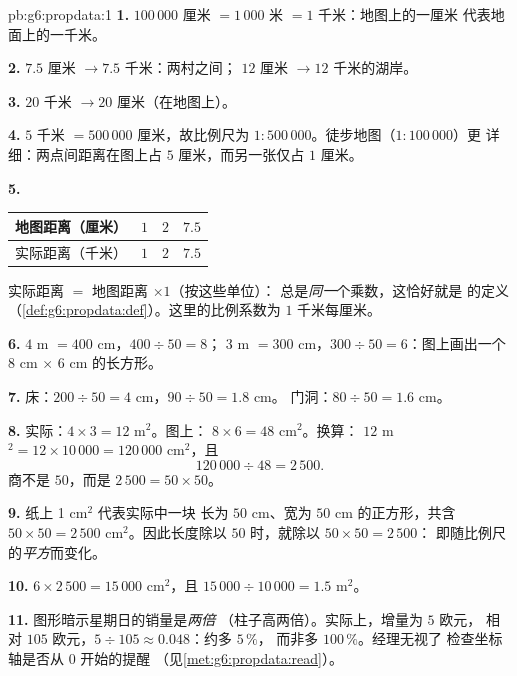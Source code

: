 \begin{solution}{pb:g6:propdata:1}
\textbf{1.} $100\,000$ 厘米 $= 1\,000$ 米 $= 1$ 千米：地图上的一厘米
代表地面上的一千米。

\textbf{2.} $7.5$ 厘米 $\rightarrow 7.5$ 千米：两村之间；
$12$ 厘米 $\rightarrow 12$ 千米的湖岸。

\textbf{3.} $20$ 千米 $\rightarrow 20$ 厘米（在地图上）。

\textbf{4.} $5$ 千米 $= 500\,000$ 厘米，故比例尺为
$1:500\,000$。徒步地图（$1:100\,000$）更
详细：两点间距离在图上占 $5$ 厘米，而另一张仅占
$1$ 厘米。

\textbf{5.}
\begin{center}
\renewcommand{\arraystretch}{1.2}
\begin{tabular}{l|ccc}
地图距离（厘米） & $1$ & $2$ & $7.5$ \\
\hline
实际距离（千米） & $1$ & $2$ & $7.5$ \\
\end{tabular}
\end{center}
实际距离 $=$ 地图距离 $\times 1$（按这些单位）：
总是\emph{同一}个乘数，这恰好就是
的定义
（\cref{def:g6:propdata:def}）。这里的比例系数为 $1$
千米每厘米。

\textbf{6.} $4$ m $= 400$ cm，$400 \div 50 = 8$；
$3$ m $= 300$ cm，$300 \div 50 = 6$：图上画出一个
$8$ cm $\times$ $6$ cm 的长方形。

\textbf{7.} 床：$200 \div 50 = 4$ cm，$90 \div 50 = 1.8$ cm。
门洞：$80 \div 50 = 1.6$ cm。

\textbf{8.} 实际：$4 \times 3 = 12$ m$^2$。图上：
$8 \times 6 = 48$ cm$^2$。换算：
$12$ m$^2 = 12 \times 10\,000 = 120\,000$ cm$^2$，且
\[
120\,000 \div 48 = 2\,500 .
\]
商不是 $50$，而是 $2\,500 = 50 \times 50$。

\textbf{9.} 纸上 1 cm$^2$ 代表实际中一块
长为 $50$ cm、宽为 $50$ cm 的正方形，共含
$50 \times 50 = 2\,500$ cm$^2$。因此长度除以
$50$ 时，就除以 $50 \times 50 = 2\,500$：
即随比例尺的\emph{平方}而变化。

\textbf{10.} $6 \times 2\,500 = 15\,000$ cm$^2$，且
$15\,000 \div 10\,000 = 1.5$ m$^2$。

\textbf{11.} 图形暗示星期日的销量是\emph{两倍}
（柱子高两倍）。实际上，增量为 $5$ 欧元，
相对 $105$ 欧元，$5 \div 105 \approx 0.048$：约多 $5\,\%$，
而非多 $100\,\%$。经理无视了
检查坐标轴是否从 $0$ 开始的提醒
（见\cref{met:g6:propdata:read}）。


\end{solution}
